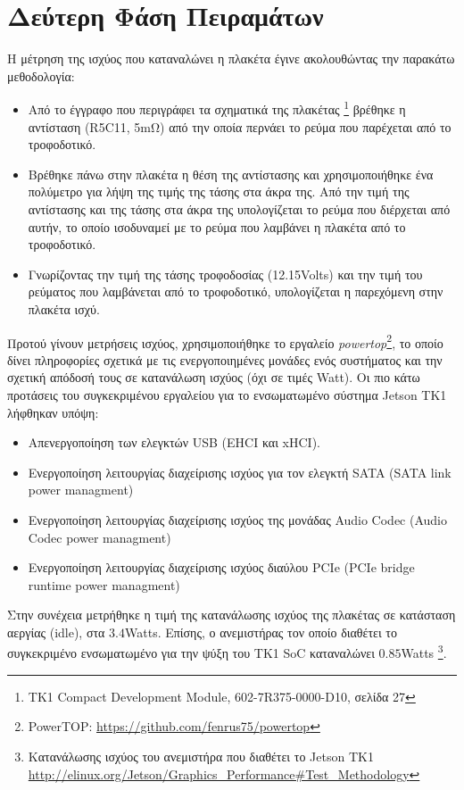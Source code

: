 \section{Δεύτερη Φάση Πειραμάτων}
\label{sec:experiments_phase2}

Η μέτρηση της ισχύος που καταναλώνει η πλακέτα έγινε ακολουθώντας την παρακάτω μεθοδολογία:
\begin{itemize}
  \item{Από το έγγραφο που περιγράφει τα σχηματικά της πλακέτας \footnote{TK1 Compact Development Module,  602-7R375-0000-D10, σελίδα 27}
    βρέθηκε η αντίσταση (R5C11, 5mΩ) από την οποία περνάει το ρεύμα που παρέχεται από το τροφοδοτικό.}
  \item{Βρέθηκε πάνω στην πλακέτα η θέση της αντίστασης και χρησιμοποιήθηκε ένα
    πολύμετρο για λήψη της τιμής της τάσης στα άκρα της.
    Από την τιμή της αντίστασης και της τάσης στα άκρα της υπολογίζεται το ρεύμα που διέρχεται από αυτήν,
    το οποίο ισοδυναμεί με το ρεύμα που λαμβάνει η πλακέτα από το τροφοδοτικό.}
  \item{Γνωρίζοντας την τιμή της τάσης τροφοδοσίας (12.15Volts) και την τιμή
    του ρεύματος που λαμβάνεται από το τροφοδοτικό, υπολογίζεται η παρεχόμενη στην πλακέτα ισχύ.}
\end{itemize}

Προτού γίνουν μετρήσεις ισχύος, χρησιμοποιήθηκε το εργαλείο \emph{powertop}\footnote{PowerTOP: \url{https://github.com/fenrus75/powertop}},
το οποίο δίνει πληροφορίες σχετικά με τις ενεργοποιημένες μονάδες ενός συστήματος
και την σχετική απόδοσή τους σε κατανάλωση ισχύος (όχι σε τιμές Watt).
Οι πιο κάτω προτάσεις του συγκεκριμένου εργαλείου για το
ενσωματωμένο σύστημα Jetson TK1 λήφθηκαν υπόψη:
\begin{itemize}
  \item{Απενεργοποίηση των ελεγκτών USB (EHCI και xHCI).}
  \item{Ενεργοποίηση λειτουργίας διαχείρισης ισχύος για τον ελεγκτή SATA (SATA link power managment)}
  \item{Ενεργοποίηση λειτουργίας διαχείρισης ισχύος της μονάδας Audio Codec (Audio Codec power managment)}
  \item{Ενεργοποίηση λειτουργίας διαχείρισης ισχύος διαύλου PCIe (PCIe bridge runtime power managment)}
\end{itemize}

Στην συνέχεια μετρήθηκε η τιμή της κατανάλωσης ισχύος της πλακέτας σε κατάσταση αεργίας (idle),
στα $3.4$Watts. Επίσης, ο ανεμιστήρας τον οποίο
διαθέτει το συγκεκριμένο ενσωματωμένο για την ψύξη του TK1 SoC καταναλώνει $0.85$Watts
\footnote{Κατανάλωσης ισχύος του ανεμιστήρα που διαθέτει το Jetson TK1 \url{http://elinux.org/Jetson/Graphics_Performance\#Test_Methodology}}.



